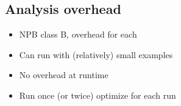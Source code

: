 \subsection{Analysis overhead}
\label{sec:expe-overhead}
\begin{itemize}
    \item NPB class B, overhead for each
    \item Can run with (relatively) small  examples
    \item No overhead at runtime
    \item Run once (or twice) optimize for each run
\end{itemize}

